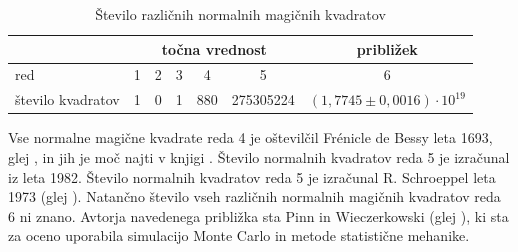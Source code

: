 \documentclass[a4paper,12pt]{article}
\theoremstyle{definition}
\theoremstyle{plain}
\begin{document}
\begin{table}[!ht]
   \centering
   \caption{Število različnih normalnih magičnih kvadratov}
   \label{table:stevila}
   \begin{tabular}{lcccccc}\toprule
      & \multicolumn{5}{c}{točna vrednost} & približek \\ \midrule
      red & 1 & 2 & 3 & 4 & 5 & 6 \\
      število kvadratov & 1 & 0 & 1 & 880 & 275305224 & $(1{,}7745 \pm 0{,}0016) \cdot 10^{19}$ \\
      \bottomrule
   \end{tabular}
\end{table}

Vse normalne magične kvadrate reda 4 je oštevilčil Frénicle de Bessy
leta 1693, glej \cite{bessy}, in jih je moč najti v knjigi \cite{berlekamp}. Število normalnih kvadratov reda 5 je izračunal
iz leta 1982. Število normalnih kvadratov reda 5 je izračunal
R. Schroeppel leta 1973 (glej \cite{gardner}).
Natančno število vseh različnih normalnih magičnih kvadratov reda 6 ni znano.
Avtorja navedenega približka sta Pinn in Wieczerkowski (glej \cite{pinn}), ki
sta za oceno uporabila simulacijo Monte Carlo in metode statistične mehanike.


\newpage



\end{document}
